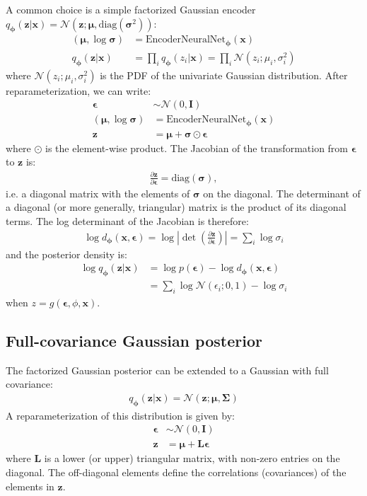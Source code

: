 \documentclass[MAL,biber]{nowfnt} %
\newcommand{\bb}[1]{\mathbf{#1}}
\newcommand{\bx}{\bb{x}}
\newcommand{\bz}{\bb{z}}
\newcommand{\bphi}{\boldsymbol{\phi}}
\newcommand{\beps}{\boldsymbol{\epsilon}}
\newcommand{\bsigma}{\boldsymbol{\sigma}}
\newcommand{\bmu}{\boldsymbol{\mu}}
\newcommand{\bL}{\bb{L}}
\newcommand{\bI}{\bb{I}}
\newcommand{\qP}{q_{\bphi}}
\newcommand{\EncoderNeuralNet}{\text{EncoderNeuralNet}_{\bphi}}
\newcommand{\dP}{d_{\bphi}}
\begin{document}
A common choice is a simple factorized Gaussian encoder\\$\qP(\bz|\bx) = \mathcal{N}(\bz; \bmu, \text{diag}(\bsigma^2))$:
\begin{align}
(\bmu, \log \bsigma) &= \EncoderNeuralNet(\bx)\\
\qP(\bz|\bx) &= \prod_i \qP(z_i|\bx) = \prod_i \mathcal{N}(z_i; \mu_i, \sigma_i^2)
\end{align}
where $\mathcal{N}(z_i; \mu_i, \sigma_i^2)$ is the PDF of the univariate Gaussian distribution. After reparameterization, we can write:
\begin{align}
\beps &\sim \mathcal{N}(0,\bI)\\
(\bmu, \log \bsigma) &= \EncoderNeuralNet(\bx)\\
\bz &= \bmu + \bsigma \odot \beps
\end{align}
where $\odot$ is the element-wise product. The Jacobian of the transformation from $\beps$ to $\bz$ is:
\begin{align}
\frac{\partial \bz}{\partial \beps} = \text{diag}(\bsigma),
\end{align}
i.e. a diagonal matrix with the elements of $\bsigma$ on the diagonal. The determinant of a diagonal (or more generally, triangular) matrix is the product of its diagonal terms. The log determinant of the Jacobian is therefore:
\begin{align}
\log \dP(\bx,\beps) = \log \left| \det \left(\frac{\partial \bz}{\partial \beps}\right) \right| = \sum_i \log \sigma_i
\label{eq:factgausslogdet}
\end{align}
and the posterior density is:
\begin{align}
\log \qP(\bz|\bx)
&= \log p(\beps) - \log \dP(\bx,\beps)\\
&= \sum_i \log \mathcal{N}(\epsilon_i; 0, 1) - \log \sigma_i
\end{align}
when $z=g(\beps,\phi,\bx)$.

\subsection{Full-covariance Gaussian posterior}
The factorized Gaussian posterior can be extended to a Gaussian with full covariance:
\begin{align}
\qP(\bz|\bx) = \mathcal{N}(\bz; \bmu, \boldsymbol{\Sigma})
\end{align}
A reparameterization of this distribution is given by:
\begin{align}
\beps &\sim \mathcal{N}(0,\bI)\\
\bz &= \bmu + \bL \beps
\end{align}
where $\bL$ is a lower (or upper) triangular matrix, with non-zero entries on the diagonal. The off-diagonal elements define the correlations (covariances) of the elements in $\bz$.
\end{document}
